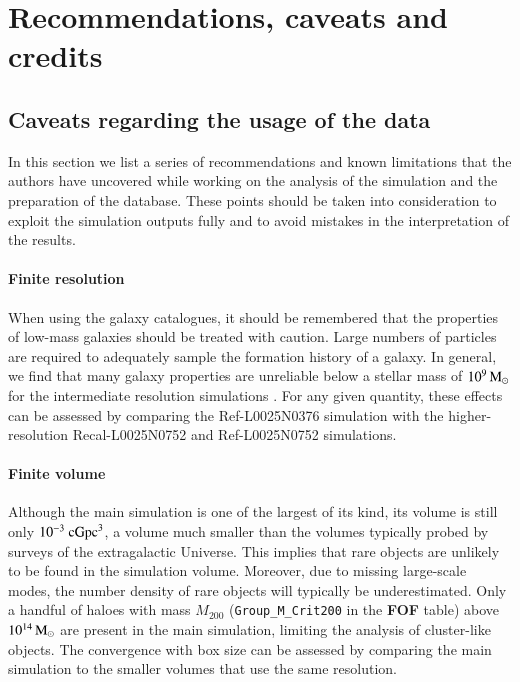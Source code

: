 \section{Recommendations, caveats and credits}
\label{caveats}

\subsection{Caveats regarding the usage of the data}

In this section we list a series of recommendations and known limitations that the
authors have uncovered while working on the analysis of the simulation and the
preparation of the database. These points should be taken into consideration to
exploit the simulation outputs fully and to avoid mistakes in the interpretation
of the results.

\paragraph{\bf Finite resolution}
When using the galaxy catalogues, it should be remembered that the properties of
low-mass galaxies should be treated with caution. Large numbers of particles are
required to adequately sample the formation history of a galaxy. In general, we
find that many galaxy properties are unreliable below a stellar mass of $10^{9}
\, \mathrm{M}_\odot$ for the intermediate resolution simulations \citep{Schaye2015}. For any
given quantity, these effects can be assessed by comparing the Ref-L0025N0376
simulation with the higher-resolution Recal-L0025N0752 and Ref-L0025N0752
simulations.

\paragraph{\bf Finite volume}
Although the main simulation is one of the largest of its kind, its volume is
still only $10^{-3}~\rm{cGpc}^3$, a volume much smaller than the volumes
typically probed by surveys of the extragalactic Universe. This implies that
rare objects are unlikely to be found in the simulation volume. Moreover, due to
missing large-scale modes, the number density of rare objects will typically be
underestimated. Only a handful of haloes with mass $M_{200}$
(\texttt{Group\_M\_Crit200} in the {\bf FOF} table) above $10^{14}\, \mathrm{M}_\odot$ are
present in the main simulation, limiting the analysis of cluster-like
objects. The convergence with box size can be assessed by comparing the main
simulation to the smaller volumes that use the same resolution.

